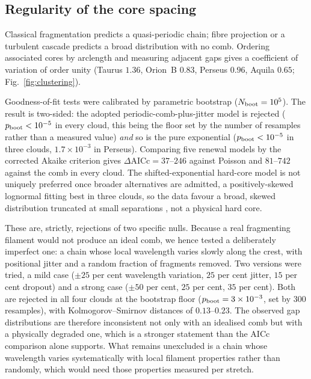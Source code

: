 \documentclass[usenatbib,twoside,twocolumn]{mnras}
\begin{document}
\subsection{Regularity of the core spacing}
\label{sec:clustering}

Classical fragmentation predicts a quasi-periodic chain; fibre projection or a turbulent cascade predicts a broad distribution with no comb. Ordering associated cores by arclength and measuring adjacent gaps gives a coefficient of variation of order unity (Taurus $1.36$, Orion~B $0.83$, Perseus $0.96$, Aquila $0.65$; Fig.~\ref{fig:clustering}).

Goodness-of-fit tests were calibrated by parametric bootstrap ($N_{\rm boot}=10^5$). The result is two-sided: the adopted periodic-comb-plus-jitter model is rejected ($p_{\rm boot}<10^{-5}$ in every cloud, this being the floor set by the number of resamples rather than a measured value) \emph{and} so is the pure exponential ($p_{\rm boot}<10^{-5}$ in three clouds, $1.7\times10^{-3}$ in Perseus). Comparing five renewal models by the corrected Akaike criterion gives $\Delta$AICc$=37$--$246$ against Poisson and $81$--$742$ against the comb in every cloud. The shifted-exponential hard-core model is not uniquely preferred once broader alternatives are admitted, a positively-skewed lognormal fitting best in three clouds, so the data favour a broad, skewed distribution truncated at small separations , not a physical hard core.

These are, strictly, rejections of two specific nulls. Because a real fragmenting filament would not produce an ideal comb, we hence tested a deliberately imperfect one: a chain whose local wavelength varies slowly along the crest, with positional jitter and a random fraction of fragments removed. Two versions were tried, a mild case ($\pm25$ per cent wavelength variation, $25$ per cent jitter, $15$ per cent dropout) and a strong case ($\pm50$ per cent, $25$ per cent, $35$ per cent). Both are rejected in all four clouds at the bootstrap floor ($p_{\rm boot}=3\times10^{-3}$, set by $300$ resamples), with Kolmogorov--Smirnov distances of $0.13$--$0.23$. The observed gap distributions are therefore inconsistent not only with an idealised comb but with a physically degraded one, which is a stronger statement than the AICc comparison alone supports. What remains unexcluded is a chain whose wavelength varies systematically with local filament properties rather than randomly, which would need those properties measured per stretch.
\end{document}
